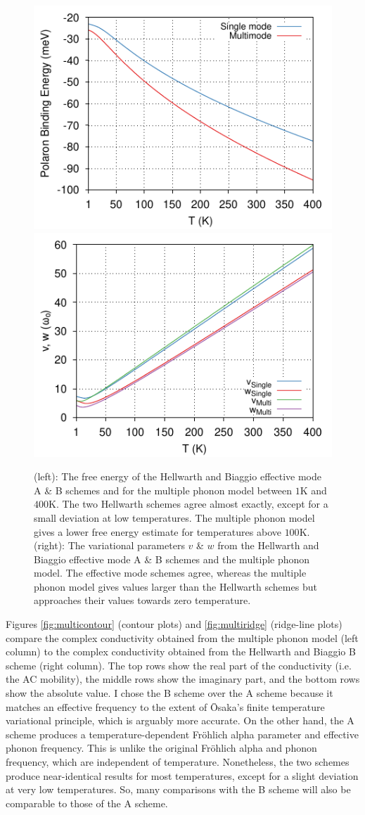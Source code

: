 \begin{figure}[t]
    \centering
    \includegraphics[width=.49\textwidth]{figures/MAPI-energy-temp-1to400K-COLOUR.pdf}
    \includegraphics[width=.49\textwidth]{figures/MAPI-vw-temp-1to400K-COLOUR.pdf}
    \caption{(left): The free energy of the Hellwarth and Biaggio effective mode A \& B schemes and for the multiple phonon model between $1$K and $400$K. The two Hellwarth schemes agree almost exactly, except for a small deviation at low temperatures. The multiple phonon model gives a lower free energy estimate for temperatures above $100$K. (right): The variational parameters $v$ \& $w$ from the Hellwarth and Biaggio effective mode A \& B schemes and the multiple phonon model. The effective mode schemes agree, whereas the multiple phonon model gives values larger than the Hellwarth schemes but approaches their values towards zero temperature.}
    \label{fig:multitheory}
\end{figure}

Figures \ref{fig:multicontour} (contour plots) and \ref{fig:multiridge} (ridge-line plots) compare the complex conductivity obtained from the multiple phonon model (left column) to the complex conductivity obtained from the Hellwarth and Biaggio B scheme (right column). The top rows show the real part of the conductivity (i.e. the AC mobility), the middle rows show the imaginary part, and the bottom rows show the absolute value. I chose the B scheme over the A scheme because it matches an effective frequency to the extent of \=Osaka's finite temperature variational principle, which is arguably more accurate. On the other hand, the A scheme produces a temperature-dependent Fr\"ohlich alpha parameter and effective phonon frequency. This is unlike the original Fr\"ohlich alpha and phonon frequency, which are independent of temperature. Nonetheless, the two schemes produce near-identical results for most temperatures, except for a slight deviation at very low temperatures. So, many comparisons with the B scheme will also be comparable to those of the A scheme. 

